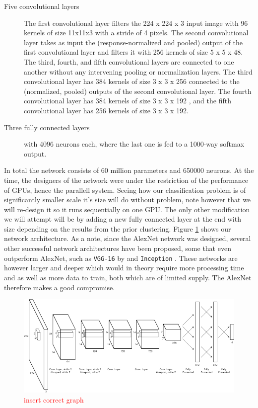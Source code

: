 \begin{description}
	\item[Five convolutional layers] The first convolutional layer filters the 224 x 224 x 3 input image with 96 kernels of size 11x11x3 with a stride of 4 pixels. The second convolutional layer takes as input the (response-normalized and pooled) output of the first convolutional layer and filters it with 256 kernels of size 5 x 5 x 48. The third, fourth, and fifth convolutional layers are connected to one another without any intervening pooling or normalization layers. The third convolutional layer has 384 kernels of size 3 x 3 x 256 connected to the (normalized, pooled) outputs of the second convolutional layer. The fourth convolutional layer has 384 kernels of size 3 x 3 x 192 , and the fifth convolutional layer has 256 kernels of size 3 x 3 x 192.
	\item[Three fully connected layers] with 4096 neurons each, where the last one is fed to a 1000-way softmax output.
\end{description}

In total the network consists of 60 million parameters and 650000 neurons. At the time, the designers of the network were under the restriction of the performance of GPUs, hence the parallell system. Seeing how our classification problem is of significantly smaller scale it's size will do without problem, note however that we will re-design it so it runs sequentially on one GPU. The only other modification we will attempt will be by adding a new fully connected layer at the end with size depending on the results from the prior clustering. Figure \ref{fig:method_cnn_arch} shows our network architecture. As a note, since the AlexNet network was designed, several other successful network architectures have been proposed, some that even outperform AlexNet, such as \texttt{VGG-16} by \textcite{Arge2015} and \texttt{Inception} \textcite{Szegedy2014}. These networks are however larger and deeper which would in theory require more processing time and as well as more data to train, both which are of limited supply. The AlexNet therefore makes a good compromise.

\begin{figure}
	\centering
	\includegraphics[width=\textwidth]{img/related-work/cnn-architecture.png}
	\caption{\textcolor{red}{insert correct graph}}
	\label{fig:method_cnn_arch}
\end{figure}

